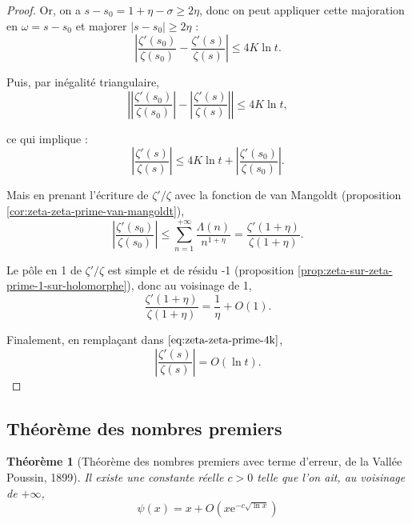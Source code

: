 \documentclass[french]{report}
\newtheorem{theorem}{Théorème}[section]
\begin{document}
\begin{proof}
  Or, on a $s-s_0=1+\eta-\sigma\geq 2\eta$, donc on peut appliquer cette majoration en $\omega=s-s_0$ et majorer $|s-s_0|\geq 2\eta$ :
  \[
    \left|\frac{\zeta'(s_0)}{\zeta(s_0)}-\frac{\zeta'(s)}{\zeta(s)}\right|
    \leq 4K\ln t.
  \]

  Puis, par inégalité triangulaire,
  \[
    \left|\left|\frac{\zeta'(s_0)}{\zeta(s_0)}\right|-\left|\frac{\zeta'(s)}{\zeta(s)}\right|\right|
    \leq 4K\ln t,
  \]

  ce qui implique :
  \begin{equation}\label{eq:zeta-zeta-prime-4k}
    \left|\frac{\zeta'(s)}{\zeta(s)}\right|
    \leq 4K\ln t
    + \left|\frac{\zeta'(s_0)}{\zeta(s_0)}\right|.
  \end{equation}

  Mais en prenant l'écriture de $\zeta'/\zeta$ avec la fonction de van Mangoldt (proposition \ref{cor:zeta-zeta-prime-van-mangoldt}),
  \[
    \left|\frac{\zeta'(s_0)}{\zeta(s_0)}\right|
    \leq \sum_{n=1}^{+\infty}\frac{\Lambda(n)}{n^{1+\eta}}
    = \frac{\zeta'(1+\eta)}{\zeta(1+\eta)}.
  \]

  Le pôle en 1 de $\zeta'/\zeta$ est simple et de résidu -1 (proposition \ref{prop:zeta-sur-zeta-prime-1-sur-holomorphe}), donc au voisinage de 1,
  \[
    \frac{\zeta'(1+\eta)}{\zeta(1+\eta)}
    =\frac{1}{\eta} + O(1).
  \]

  Finalement, en remplaçant dans $\ref{eq:zeta-zeta-prime-4k}$,
  \[
    \left|\frac{\zeta'(s)}{\zeta(s)}\right| = O(\ln t).
  \]
\end{proof}

\subsection{Théorème des nombres premiers}

\begin{theorem}[Théorème des nombres premiers avec terme d'erreur, de la Vallée Poussin, 1899]\label{thm:tnp-terme-erreur-classique}
  Il existe une constante réelle $c>0$ telle que l'on ait, au voisinage de $+\infty$,
  \begin{equation}
    \psi(x)=x+O(x\mathrm{e}^{-c\sqrt{\ln x}})
  \end{equation}
\end{theorem}
\end{document}
